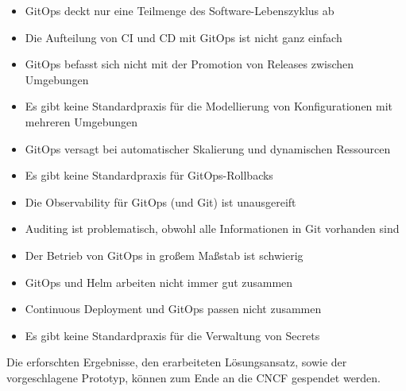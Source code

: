 \begin{itemize}
	\item GitOps deckt nur eine Teilmenge des Software-Lebenszyklus ab
	\item Die Aufteilung von CI und CD mit GitOps ist nicht ganz einfach
	\item GitOps befasst sich nicht mit der Promotion von Releases zwischen Umgebungen
	\item Es gibt keine Standardpraxis für die Modellierung von Konfigurationen mit mehreren Umgebungen
	\item GitOps versagt bei automatischer Skalierung und dynamischen Ressourcen
	\item Es gibt keine Standardpraxis für GitOps-Rollbacks
	\item Die Observability für GitOps (und Git) ist unausgereift
	\item Auditing ist problematisch, obwohl alle Informationen in Git vorhanden sind
	\item Der Betrieb von GitOps in großem Maßstab ist schwierig
	\item GitOps und Helm arbeiten nicht immer gut zusammen
	\item Continuous Deployment und GitOps passen nicht zusammen
	\item Es gibt keine Standardpraxis für die Verwaltung von Secrets
\end{itemize}

\noindent
\autocite{codefreshGitopsPains10}
\bigskip




\noindent
Die erforschten Ergebnisse,
den erarbeiteten Lösungsansatz,
sowie der vorgeschlagene Prototyp,
können zum Ende
an die CNCF gespendet werden.

